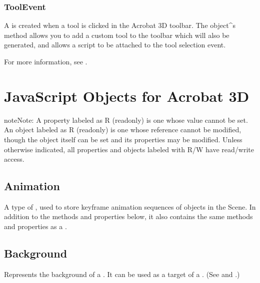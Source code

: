\documentclass[letterpaper,12pt,english,openany,oneside]{sphinxmanual}
\begin{document}
\subsection{ToolEvent}
\label{\detokenize{index:toolevent}}
A  is created when a tool is clicked in the Acrobat 3D toolbar. The  object\textasciicircum{}s  method allows you to add a custom tool to the toolbar which will also be generated, and allows a script to be attached to the tool selection event.

For more information, see .


\chapter{JavaScript Objects for Acrobat 3D}
\label{\detokenize{JS_3D_API:javascript-objects-for-acrobat-3d}}\label{\detokenize{JS_3D_API::doc}}
\begin{sphinxadmonition}{note}{Note:}
A property labeled as R (read\sphinxhyphen{}only) is one whose value cannot be set. An object labeled as R (read\sphinxhyphen{}only) is one whose reference cannot be modified, though the object itself can be set and its properties may be modified. Unless otherwise indicated, all properties and objects labeled with R/W have read/write access.
\end{sphinxadmonition}


\section{Animation}
\label{\detokenize{JS_3D_API:animation}}
A type of , used to store keyframe animation sequences of  objects in the Scene. In addition to the methods and properties below, it also contains the same methods and properties as a .



\section{Background}
\label{\detokenize{JS_3D_API:background}}
Represents the background of a . It can be used as a target of a . (See  and .)
\end{document}
